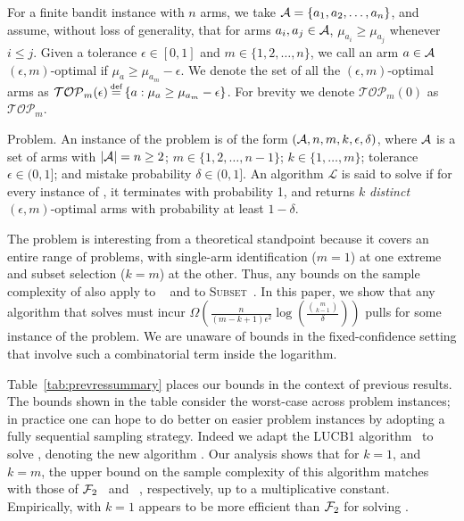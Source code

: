 For a finite bandit instance with $n$ arms, we take $\mathcal{A} = \{a_{1}, a_{2}, \dots, a_{n}\}$, and assume, without
loss of generality, that for arms $a_i, a_j \in \mathcal{A}$, $\mu_{a_i} \geq \mu_{a_j}$ whenever $i \leq j$. Given a tolerance $\epsilon \in [0, 1]$ and  $m \in \{1, 2,  \dots, n\}$, we call an arm $a \in \mathcal{A}$
 $(\epsilon, m)$-optimal if $\mu_a \geq \mu_{a_m} - \epsilon$. We denote the set of 
all the $(\epsilon, m)$-optimal arms as  $\mathcal{TOP}_m(\epsilon) \defeq \{a: \mu_a \geq \mu_{a_m} -\epsilon\}$. For brevity we denote $\mathcal{TOP}_m(0)$ as $\mathcal{TOP}_m$. 

\begin{definition}{\QFK Problem.}
An instance of the \QFK problem is of the form $(\mathcal{A}, n, m, k, \epsilon, \delta)$, where $\mathcal{A}$ is a set of arms with $|\mathcal{A}| = n \geq 2$; $m \in \{1, 2, \dots, n - 1\}$; $k \in \{1, \dots, m\}$; tolerance $\epsilon \in (0, 1]$; and mistake probability $\delta \in (0,1]$. An algorithm $\mathcal{L}$ is said to solve
\QFK if for every instance of \QFK, it terminates
with probability 1, and returns $k$ \emph{distinct} $(\epsilon, m)$-optimal arms with probability at least $1-\delta$.
\end{definition}

The \QFK problem is interesting from a theoretical standpoint because it covers an entire range of problems,
with single-arm identification ($m = 1$) at one extreme and subset selection ($k = m$) at the other. Thus, any bounds on the sample
complexity of \QFK also apply to \QF~\citep{bib:arcsk2017} and to \textsc{Subset}~\citep{bib:explorem}. 
In this paper, we show that any algorithm that solves \QFK must incur 
$\Omega\left(\frac{n}{(m - k + 1)\epsilon^{2}} \log\left(\frac{\binom{m}{k - 1}}{\delta}\right)\right)$ 
pulls for some instance of the problem. We are unaware of bounds in the fixed-confidence setting that 
involve such a combinatorial term inside the logarithm. 

Table~\ref{tab:prevressummary} places our bounds in the context of previous results. 
The bounds shown in the table consider the worst-case across problem instances; 
in practice one can hope to do better on easier problem instances by adopting a fully 
sequential sampling strategy. Indeed we adapt the \textsc{LUCB1} algorithm~\citep{bib:lucb} 
to solve \QFK, denoting the new algorithm \GLUCB. Our analysis shows that for $k=1$, and $k=m$, 
the upper bound on the sample complexity of this algorithm matches with those of 
$\mathcal{F}_2$~\citep{bib:arcsk2017} and \LUCB~\citep{bib:lucb}, respectively, up to a multiplicative constant.
Empirically, \GLUCB with $k = 1$ appears to be more efficient than $\mathcal{F}_2$ for solving \QF.

